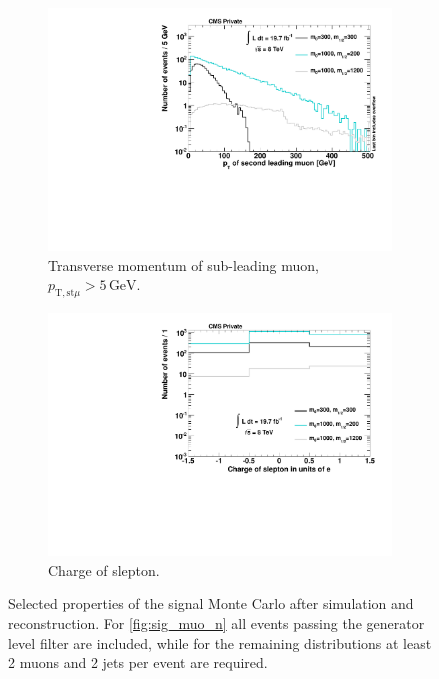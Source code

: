 \begin{figure}[!htbp]
  \ContinuedFloat
  \centering
  \begin{subfigure}[b]{0.495\textwidth}
    \centering
    \includegraphics[width=\textwidth]{plots/sig_muo_pt2.pdf}
    \caption{Transverse momentum of sub-leading muon, $p_{\text{T}, \text{st} \mu} > 5\,\text{GeV}$.\label{fig:sig_muo_pt2}}
  \end{subfigure}
  \begin{subfigure}[b]{0.495\textwidth}
    \centering
    \includegraphics[width=\textwidth]{plots/sig_slepton_charge.pdf}
    \caption{Charge of slepton.\label{fig:sig_slepton_charge}}
  \end{subfigure}
  \caption{Selected properties of the signal Monte Carlo after simulation and reconstruction. For \ref{fig:sig_muo_n} all events passing the generator level filter are included, while for the remaining distributions at least 2 muons and 2 jets per event are required.}
  \label{fig:signal_properties}
\end{figure}

